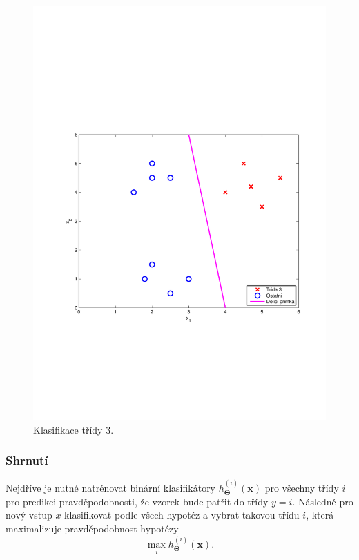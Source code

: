 \begin{figure}[!ht]
\begin{minipage}[b]{0.48\textwidth}
		\includegraphics[width = \textwidth, trim = 2.5cm 7cm 2cm 9cm]{./Img/BinarniRegrese/oneVSallClassification/oneVSall_3.pdf}
  		\caption{Klasifikace třídy 3.}
		\label{fig:oneVSall_3}
	\end{minipage}%
\end{figure}

\subsubsection*{Shrnutí}
\par{Nejdříve je nutné natrénovat binární klasifikátory $h_{\bm{\Theta}}^{\left( i \right)} \left( \bm{x} \right)$ pro všechny třídy $i$ pro predikci pravděpodobnosti, že vzorek bude patřit do třídy $y = i$. Následně pro nový vstup $x$ klasifikovat podle všech hypotéz a vybrat takovou třídu $i$, která maximalizuje pravděpodobnost hypotézy
\begin{equation}
	 \max_{i} h_{\bm{\Theta}}^{\left( i \right)} \left( \bm{x} \right).
\end{equation}}


\newpage



















